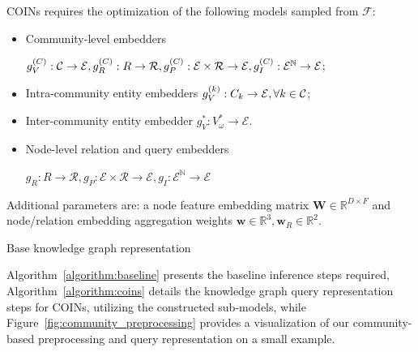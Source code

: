 COINs requires the optimization of the following models sampled from $\mathcal{F}$:
\begin{itemize}
    \item {Community-level embedders} 
    
    $g_V^{\mathopen{}\left(C\right)}: \mathcal{C} \to \mathcal{E}, g_R^{\mathopen{}\left(C\right)}: R \to \mathcal{R}, g_P^{\mathopen{}\left(C\right)}: \mathcal{E} \times \mathcal{R} \to \mathcal{E}, g_I^{\mathopen{}\left(C\right)}: \mathcal{E}^{\mathbb{N}} \to \mathcal{E}$;
    \item {Intra-community entity embedders} $g_V^{\mathopen{}\left(k\right)}: C_k \to \mathcal{E}, \forall k \in \mathcal{C}$;
    \item {Inter-community entity embedder} $g_V^{*}: V_{\omega}^* \to \mathcal{E}$. 
    \item {Node-level relation and query embedders} 
    
    $g_R: R \to \mathcal{R}, g_P: \mathcal{E} \times \mathcal{R} \to \mathcal{E}, g_I: \mathcal{E}^{\mathbb{N}} \to \mathcal{E}$
\end{itemize}

Additional parameters are: a {node feature embedding matrix} $\mathbf{W} \in \mathbb{R}^{D \times F}$ and {node/relation embedding aggregation weights} $\mathbf{w} \in \mathbb{R}^{3}, \mathbf{w}_R \in \mathbb{R}^{2}$.

\begin{algorithm}[H]
    \caption{Base knowledge graph representation}
    \label{algorithm:baseline}
    \begin{algorithmic}[1]
    \end{algorithmic}
\end{algorithm}

 Algorithm~\ref{algorithm:baseline} presents the baseline inference steps required, Algorithm~\ref{algorithm:coins} details the knowledge graph query representation steps for COINs, utilizing the constructed sub-models, while Figure~\ref{fig:community_preprocessing} provides a visualization of our community-based preprocessing and query representation on a small example. 

